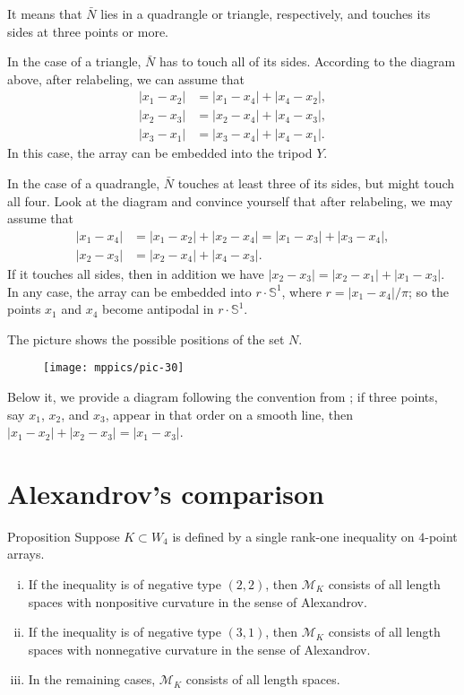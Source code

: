 \documentclass[a4paper,10pt]{article}
\begin{document}
It means that $\bar N$ lies in a quadrangle or triangle, respectively, and touches its sides at three points or more.

In the case of a triangle, $\bar N$ has to touch all of its sides.
According to the diagram above, after relabeling, we can assume that
\begin{align*}
|x_1-x_2|&=|x_1-x_4|+|x_4-x_2|,
\\
|x_2-x_3|&=|x_2-x_4|+|x_4-x_3|,
\\
|x_3-x_1|&=|x_3-x_4|+|x_4-x_1|.
\end{align*}
In this case, the array can be embedded into the tripod $Y$.

In the case of a quadrangle, $\bar N$ touches at least three of its sides, but might touch all four.
Look at the diagram and convince yourself that after relabeling, we may assume that
\begin{align*}
|x_1-x_4|&=|x_1-x_2|+|x_2-x_4|=|x_1-x_3|+|x_3-x_4|,
\\
|x_2-x_3|&=|x_2-x_4|+|x_4-x_3|.
\end{align*}
If it touches all sides, then in addition we have $|x_2-x_3|=|x_2-x_1|+|x_1-x_3|$.
In any case, the array can be embedded into $r\cdot \mathbb{S}^1$, where $r=|x_1-x_4|/\pi$;
so the points $x_1$ and $x_4$ become antipodal in $r\cdot \mathbb{S}^1$.
\qeds

The picture shows the possible positions of the set $N$.
\begin{figure}[h!]
\centering
\vskip-0mm
\texttt{[image: mppics/pic-30]}
\vskip-0mm
\end{figure}
Below it, we provide a diagram following the convention from \cite{lebedeva-petrunin-2024};
if three points, say $x_1$, $x_2$, and $x_3$, appear in that order on a smooth line, then $|x_1-x_2|+|x_2-x_3|=|x_1-x_3|$.

\section{Alexandrov's comparison}\label{Alexandrov's comparison}

\begin{thm}{Proposition}\label{prop:Alexandrov's comparison}
Suppose $K\subset W_4$ is defined by a single rank-one inequality on $4$-point arrays.
\begin{enumerate}[(i)]
\item If the inequality is of negative type $(2,2)$, then $\mathcal{M}_K$ consists of all length spaces with nonpositive curvature in the sense of Alexandrov.
\item \label{prop:Alexandrov's comparison:(3,1)} If the inequality is of negative type $(3,1)$, then $\mathcal{M}_K$ consists of all length spaces with nonnegative curvature in the sense of Alexandrov.
\item In the remaining cases, $\mathcal{M}_K$ consists of all length spaces.
\end{enumerate}

\end{thm}
\end{document}
